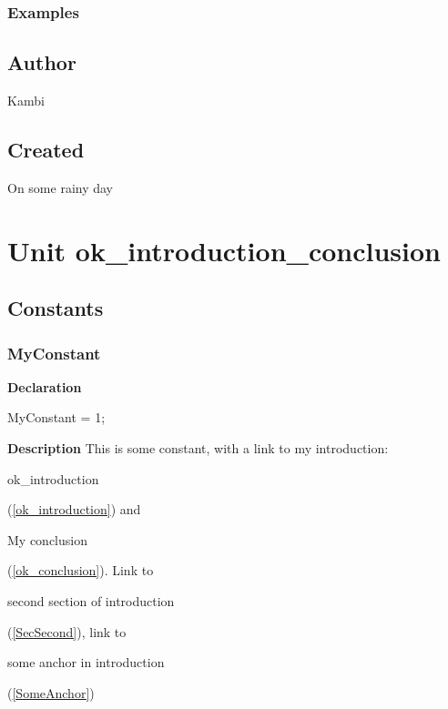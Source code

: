 \documentclass{report}
\begin{document}
\subsection*{Examples}
\section{Author}
\par
Kambi

\section{Created}
\par
On some rainy day


\chapter{Unit ok{\_}introduction{\_}conclusion}
\section{Constants}
\subsection*{MyConstant}
\begin{list}{}{
\setlength{\itemindent}{0cm}
\setlength{\listparindent}{0cm}
\setlength{\leftmargin}{\evensidemargin}
\addtolength{\leftmargin}{\tmplength}
\settowidth{\labelsep}{X}
\addtolength{\leftmargin}{\labelsep}
\setlength{\labelwidth}{\tmplength}
}
\begin{flushleft}
\item[\textbf{Declaration}\hfill]
\begin{ttfamily}
MyConstant = 1;\end{ttfamily}


\end{flushleft}
\par
\item[\textbf{Description}]
This is some constant, with a link to my introduction: \begin{ttfamily}ok{\_}introduction\end{ttfamily}(\ref{ok_introduction}) and \begin{ttfamily}My conclusion\end{ttfamily}(\ref{ok_conclusion}). Link to \begin{ttfamily}second section of introduction\end{ttfamily}(\ref{SecSecond}), link to \begin{ttfamily}some anchor in introduction\end{ttfamily}(\ref{SomeAnchor})

\end{list}
\end{document}
